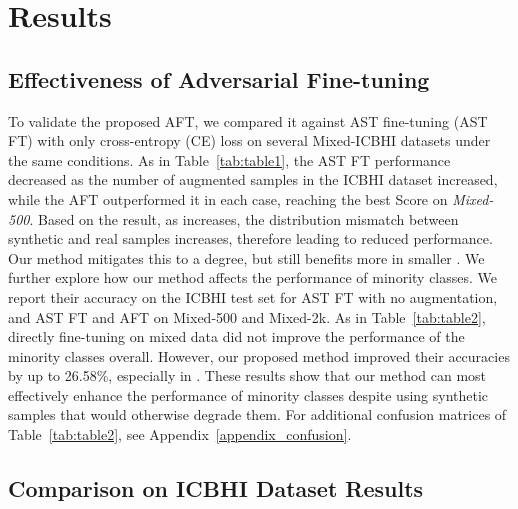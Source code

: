\documentclass{article}
\begin{document}
\section{Results} 
\subsection{Effectiveness of Adversarial Fine-tuning}
To validate the proposed AFT, we compared it against AST fine-tuning (AST FT) with only cross-entropy (CE) loss on several Mixed-ICBHI datasets under the same conditions.
As in Table~\ref{tab:table1}, the AST FT performance decreased as the number of augmented samples in the ICBHI dataset increased, while the AFT outperformed it in each case, reaching the best Score on \emph{Mixed-500}.
Based on the result, as  increases, the distribution mismatch between synthetic and real samples increases, therefore leading to reduced performance. Our method mitigates this to a degree, but still benefits more in smaller . We further explore how our method affects the performance of minority classes. We report their accuracy on the ICBHI test set for AST FT with no augmentation, and AST FT and AFT on Mixed-500 and Mixed-2k.
As in Table~\ref{tab:table2}, directly fine-tuning on mixed data did not improve the performance of the minority classes overall. However, our proposed method improved their accuracies by up to 26.58\%, especially in .
These results show that our method can most effectively enhance the performance of minority classes despite using synthetic samples that would otherwise degrade them.
For additional confusion matrices of Table~\ref{tab:table2}, see Appendix~\ref{appendix_confusion}.


\subsection{Comparison on ICBHI Dataset Results}
\end{document}
